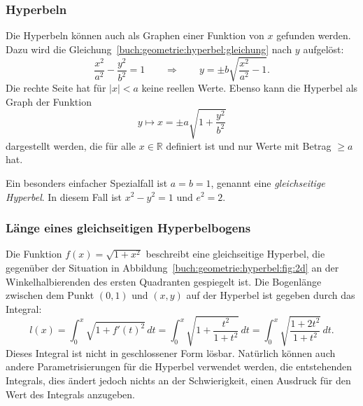 \subsubsection{Hyperbeln}
Die Hyperbeln können auch als Graphen einer Funktion von $x$ gefunden werden.
Dazu wird die Gleichung~\eqref{buch:geometrie:hyperbel:gleichung}
nach $y$ aufgelöst:
\[
\frac{x^2}{a^2}
-
\frac{y^2}{b^2}
=
1
\qquad\Rightarrow\qquad
y
=
\pm
b\sqrt{\frac{x^2}{a^2}-1}.
\]
Die rechte Seite hat für $|x|<a$ keine reellen Werte.
Ebenso kann die Hyperbel als Graph der Funktion
\[
y\mapsto x = \pm a\sqrt{1+\frac{y^2}{b^2}}
\]
dargestellt werden, die für alle $x\in\mathbb{R}$ definiert ist und
nur Werte mit Betrag $\ge a$ hat.

Ein besonders einfacher Spezialfall ist $a=b=1$, genannt eine
{\em gleichseitige Hyperbel}.
%
%
In diesem Fall ist $x^2-y^2=1$ und $e^2=2$.

\subsubsection{Länge eines gleichseitigen Hyperbelbogens}
Die Funktion $f(x)=\sqrt{1+x^2}$ beschreibt eine gleichseitige
Hyperbel, die gegenüber der Situation in
Abbildung~\ref{buch:geometrie:hyperbel:fig:2d}
an der Winkelhalbierenden des ersten Quadranten gespiegelt ist.
Die Bogenlänge zwischen dem Punkt $(0,1)$ und $(x,y)$ auf der
Hyperbel ist gegeben durch das Integral:
\[
l(x)
=
\int_0^x \sqrt{1+f'(t)^2}\,dt
=
\int_0^x \sqrt{1+\frac{t^2}{1+t^2}}\,dt
=
\int_0^x \sqrt{\frac{1+2t^2}{1+t^2}}\,dt.
\]
Dieses Integral ist nicht in geschlossener Form lösbar.
Natürlich können auch andere Parametrisierungen für die Hyperbel
verwendet werden, die entstehenden Integrals, dies ändert jedoch
nichts an der Schwierigkeit, einen Ausdruck für den Wert des
Integrals anzugeben.

